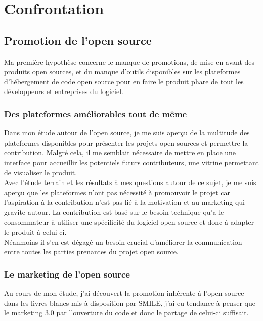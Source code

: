 \chapter{Confrontation} 

\section{Promotion de l'open source}

	Ma première hypothèse concerne le manque de promotions, de mise en avant des produits open sources, et du manque d'outils disponibles sur les plateformes d'hébergement de code open source pour en faire le produit phare de tout les développeurs et entreprises du logiciel.

	\subsection{Des plateformes améliorables tout de même}

		Dans mon étude autour de l'open source, je me suis aperçu de la multitude des plateformes disponibles pour présenter les projets open sources et permettre la contribution. Malgré cela, il me semblait nécessaire de mettre en place une interface pour accueillir les potentiels futurs contributeurs, une vitrine permettant de visualiser le produit.\\

		Avec l'étude terrain et les résultats à mes questions autour de ce sujet, je me suis aperçu que les plateformes n'ont pas nécessité à promouvoir le projet car l'aspiration à la contribution n'est pas lié à la motivation et au marketing qui gravite autour. La contribution est basé sur le besoin technique qu'a le consommateur à utiliser une spécificité du logiciel open source et donc à adapter le produit à celui-ci.\\

		Néanmoins il s'en est dégagé un besoin crucial d'améliorer la communication entre toutes les parties prenantes du projet open source.

	\subsection{Le marketing de l'open source}

		Au cours de mon étude, j'ai découvert la promotion inhérente à l'open source dans les livres blancs mis à disposition par SMILE, j'ai eu tendance à penser que le marketing 3.0 par l'ouverture du code et donc le partage de celui-ci suffisait.\\


